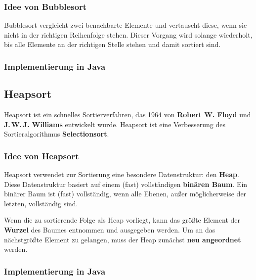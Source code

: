 \documentclass[11pt, a4paper, titlepage, oneside]{article}
\renewcommand{\emph}{\textbf}
\begin{document}
	\subsubsection{Idee von Bubblesort}
	
	Bubblesort vergleicht zwei benachbarte Elemente und vertauscht diese, wenn sie nicht in der richtigen Reihenfolge stehen. Dieser Vorgang wird solange wiederholt, bis alle Elemente an der richtigen Stelle stehen und damit sortiert sind.
	
	\subsubsection{Implementierung in Java}
	
	
	
	\subsection{Heapsort}
	
	Heapsort ist ein schnelles Sortierverfahren, das 1964 von \emph{Robert W. Floyd} und \emph{J.\,W.\,J. Williams} entwickelt wurde. Heapsort ist eine Verbesserung des Sortieralgorithmus \emph{Selectionsort}.
	
	\subsubsection{Idee von Heapsort}
	
	Heapsort verwendet zur Sortierung eine besondere Datenstruktur: den \emph{Heap}. Diese Datenstruktur basiert auf einem (fast) vollständigen \emph{binären Baum}. Ein binärer Baum ist (fast) vollständig, wenn alle Ebenen, außer möglicherweise der letzten, vollständig sind.
	
	Wenn die zu sortierende Folge als Heap vorliegt, kann das größte Element der \emph{Wurzel} des Baumes entnommen und ausgegeben werden. Um an das nächstgrößte Element zu gelangen, muss der Heap zunächst \emph{neu angeordnet} werden.
	
	\subsubsection{Implementierung in Java}
	
	
	
\end{document}
